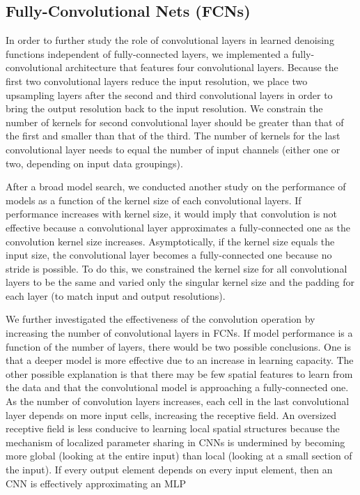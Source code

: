   \subsection{Fully-Convolutional Nets (FCNs)}

  In order to further study the role of convolutional layers in learned denoising functions independent of fully-connected layers, we implemented a fully-convolutional architecture that features four convolutional layers. Because the first two convolutional layers reduce the input resolution, we place two upsampling layers after the second and third convolutional layers in order to bring the output resolution back to the input resolution. We constrain the number of kernels for second convolutional layer should be greater than that of the first and smaller than that of the third. The number of kernels for the last convolutional layer needs to equal the number of input channels (either one or two, depending on input data groupings).

  After a broad model search, we conducted another study on the performance of models as a function of the kernel size of each convolutional layers. If performance increases with kernel size, it would imply that convolution is not effective because a convolutional layer approximates a fully-connected one as the convolution kernel size increases. Asymptotically, if the kernel size equals the input size, the convolutional layer becomes a fully-connected one because no stride is possible. To do this, we constrained the kernel size for all convolutional layers to be the same and varied only the singular kernel size and the padding for each layer (to match input and output resolutions).

  We further investigated the effectiveness of the convolution operation by increasing the number of convolutional layers in FCNs. If model performance is a function of the number of layers, there would be two possible conclusions. One is that a deeper model is more effective due to an increase in learning capacity. The other possible explanation is that there may be few spatial features to learn from the data and that the convolutional model is approaching a fully-connected one. As the number of convolution layers increases, each cell in the last convolutional layer depends on more input cells, increasing the receptive field. An oversized receptive field is less conducive to learning local spatial structures because the mechanism of localized parameter sharing in CNNs is undermined by becoming more global (looking at the entire input) than local (looking at a small section of the input). If every output element depends on every input element, then an CNN is effectively approximating an MLP

